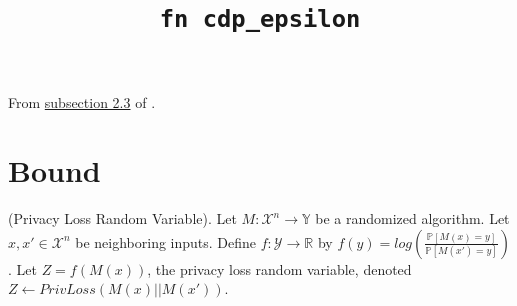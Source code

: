 


\title{\texttt{fn cdp\_epsilon}}
\author{}


\maketitle

From \href{https://arxiv.org/pdf/2004.00010.pdf#subsection.2.3}{subsection 2.3} of \cite{CKS20}.




\section{Bound}

\begin{definition}
\label{plrv}
(Privacy Loss Random Variable). 
Let $M: \mathcal{X}^n \rightarrow \mathbb{Y}$ be a randomized algorithm.
Let $x, x' \in \mathcal{X}^n$ be neighboring inputs.
Define $f: \mathcal{Y} \rightarrow \mathbb{R}$ by $f(y) = log \left( \frac{\mathbb{P}[M(x)=y]}{\mathbb{P}[M(x')=y]} \right)$.
Let $Z = f(M(x))$, the privacy loss random variable, denoted $Z \leftarrow PrivLoss(M(x) || M(x'))$.
\end{definition}

